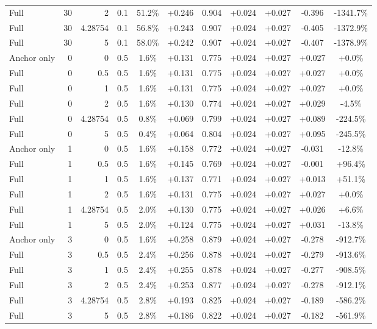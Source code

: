 \begin{table}[htbp]
\begin{tabular}{lrrrccccccc}
Full & 30 & 2 & 0.1 & 51.2\% & +0.246 & 0.904 & +0.024 & +0.027 & -0.396 & -1341.7\% \\
Full & 30 & 4.28754 & 0.1 & 56.8\% & +0.243 & 0.907 & +0.024 & +0.027 & -0.405 & -1372.9\% \\
Full & 30 & 5 & 0.1 & 58.0\% & +0.242 & 0.907 & +0.024 & +0.027 & -0.407 & -1378.9\% \\
Anchor only & 0 & 0 & 0.5 & 1.6\% & +0.131 & 0.775 & +0.024 & +0.027 & +0.027 & +0.0\% \\
Full & 0 & 0.5 & 0.5 & 1.6\% & +0.131 & 0.775 & +0.024 & +0.027 & +0.027 & +0.0\% \\
Full & 0 & 1 & 0.5 & 1.6\% & +0.131 & 0.775 & +0.024 & +0.027 & +0.027 & +0.0\% \\
Full & 0 & 2 & 0.5 & 1.6\% & +0.130 & 0.774 & +0.024 & +0.027 & +0.029 & -4.5\% \\
Full & 0 & 4.28754 & 0.5 & 0.8\% & +0.069 & 0.799 & +0.024 & +0.027 & +0.089 & -224.5\% \\
Full & 0 & 5 & 0.5 & 0.4\% & +0.064 & 0.804 & +0.024 & +0.027 & +0.095 & -245.5\% \\
Anchor only & 1 & 0 & 0.5 & 1.6\% & +0.158 & 0.772 & +0.024 & +0.027 & -0.031 & -12.8\% \\
Full & 1 & 0.5 & 0.5 & 1.6\% & +0.145 & 0.769 & +0.024 & +0.027 & -0.001 & +96.4\% \\
Full & 1 & 1 & 0.5 & 1.6\% & +0.137 & 0.771 & +0.024 & +0.027 & +0.013 & +51.1\% \\
Full & 1 & 2 & 0.5 & 1.6\% & +0.131 & 0.775 & +0.024 & +0.027 & +0.027 & +0.0\% \\
Full & 1 & 4.28754 & 0.5 & 2.0\% & +0.130 & 0.775 & +0.024 & +0.027 & +0.026 & +6.6\% \\
Full & 1 & 5 & 0.5 & 2.0\% & +0.124 & 0.775 & +0.024 & +0.027 & +0.031 & -13.8\% \\
Anchor only & 3 & 0 & 0.5 & 1.6\% & +0.258 & 0.879 & +0.024 & +0.027 & -0.278 & -912.7\% \\
Full & 3 & 0.5 & 0.5 & 2.4\% & +0.256 & 0.878 & +0.024 & +0.027 & -0.279 & -913.6\% \\
Full & 3 & 1 & 0.5 & 2.4\% & +0.255 & 0.878 & +0.024 & +0.027 & -0.277 & -908.5\% \\
Full & 3 & 2 & 0.5 & 2.4\% & +0.253 & 0.877 & +0.024 & +0.027 & -0.278 & -912.1\% \\
Full & 3 & 4.28754 & 0.5 & 2.8\% & +0.193 & 0.825 & +0.024 & +0.027 & -0.189 & -586.2\% \\
Full & 3 & 5 & 0.5 & 2.8\% & +0.186 & 0.822 & +0.024 & +0.027 & -0.182 & -561.9\% \\

\end{tabular}
\end{table}
